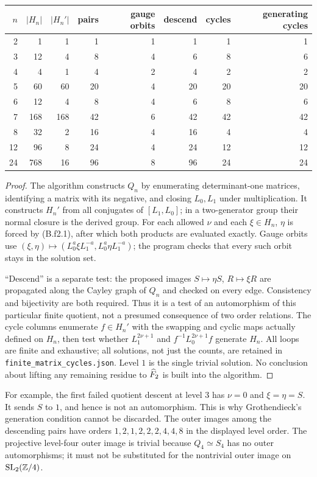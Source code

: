 \begin{center}\small
\begin{tabular}{rrrrrrrr}
\toprule
$n$&$|H_n|$&$|H_n'|$&pairs&gauge orbits&descend&cycles&generating cycles\\
\midrule
2&1&1&1&1&1&1&1\\
3&12&4&8&4&6&8&6\\
4&4&1&4&2&4&2&2\\
5&60&60&20&4&20&20&20\\
6&12&4&8&4&6&8&6\\
7&168&168&42&6&42&42&42\\
8&32&2&16&4&16&4&4\\
12&96&8&24&4&24&12&12\\
24&768&16&96&8&96&24&24\\
\bottomrule
\end{tabular}\end{center}
\begin{proof}
The algorithm constructs $Q_n$ by enumerating determinant-one matrices,
identifying a matrix with its negative, and closing $L_0,L_1$ under
multiplication. It constructs $H_n'$ from all conjugates of $[L_1,L_0]$;
in a two-generator group their normal closure is the derived group.
For each allowed $\nu$ and each $\xi\in H_n$, $\eta$ is forced by
(B.f2.1), after which both products are evaluated exactly. Gauge orbits
use $(\xi,\eta)\mapsto(L_0^a\xi L_1^{-a},L_0^a\eta L_1^{-a})$;
the program checks that every such orbit stays in the solution set.

``Descend'' is a separate test: the proposed images
$S\mapsto\eta S$, $R\mapsto\xi R$ are propagated along the Cayley
graph of $Q_n$ and checked on every edge. Consistency and bijectivity
are both required. Thus it is a test of an automorphism of this
particular finite quotient, not a presumed consequence of two order
relations. The cycle columns enumerate $f\in H_n'$ with the swapping
and cyclic maps actually defined on $H_n$, then test whether
$L_1^{2\nu+1}$ and $f^{-1}L_0^{2\nu+1}f$ generate $H_n$.
All loops are finite and exhaustive; all solutions, not just the counts,
are retained in \nolinkurl{finite_matrix_cycles.json}. Level $1$ is the
single trivial solution. No conclusion about lifting any remaining
residue to $\widehat F_2$ is built into the algorithm.
\end{proof}
For example, the first failed quotient descent at level $3$ has
$\nu=0$ and $\xi=\eta=S$. It sends $S$ to $1$, and hence is not an
automorphism. This is why Grothendieck's generation condition cannot be
discarded. The outer images among the descending pairs have orders
$1,2,1,2,2,2,4,4,8$ in the displayed level order. The projective level-four
outer image is trivial because $Q_4\simeq S_4$ has no outer automorphisms;
it must not be substituted for the nontrivial outer image on $\operatorname{SL}_2(\mathbb Z/4)$.


